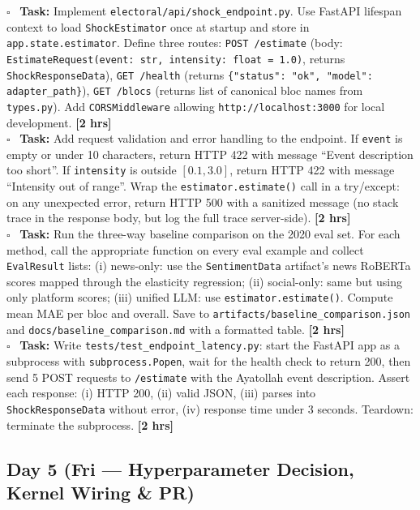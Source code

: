 \documentclass[11pt]{article}
\newcommand{\hrs}[1]{\textbf{[#1 hrs]}}
\newcommand{\dayhead}[2]{%
  \subsection*{Day #1 \normalfont\small\color{codegray}(#2)}}
\newcommand{\task}[2]{%
  \noindent\textbf{Task:} #1 \hfill \hrs{#2}\\}
\newcommand{\done}{\textcolor{sectionblue}{$\square$}\ }
\begin{document}
\begin{taskbox}
\done \task{Implement \texttt{electoral/api/shock\_endpoint.py}. Use FastAPI
  lifespan context to load \texttt{ShockEstimator} once at startup and store
  in \texttt{app.state.estimator}. Define three routes: \texttt{POST /estimate}
  (body: \texttt{EstimateRequest(event: str, intensity: float = 1.0)}, returns
  \texttt{ShockResponseData}), \texttt{GET /health} (returns
  \texttt{\{"status": "ok", "model": adapter\_path\}}), \texttt{GET /blocs}
  (returns list of canonical bloc names from \texttt{types.py}). Add
  \texttt{CORSMiddleware} allowing \texttt{http://localhost:3000} for
  local development.}{2}

\done \task{Add request validation and error handling to the endpoint.
  If \texttt{event} is empty or under 10 characters, return HTTP 422
  with message ``Event description too short''. If \texttt{intensity} is
  outside $[0.1, 3.0]$, return HTTP 422 with message ``Intensity out of
  range''. Wrap the \texttt{estimator.estimate()} call in a try/except:
  on any unexpected error, return HTTP 500 with a sanitized message (no
  stack trace in the response body, but log the full trace server-side).}{2}

\done \task{Run the three-way baseline comparison on the 2020 eval set.
  For each method, call the appropriate function on every eval example
  and collect \texttt{EvalResult} lists: (i) news-only: use the
  \texttt{SentimentData} artifact's news RoBERTa scores mapped through
  the elasticity regression; (ii) social-only: same but using only
  platform scores; (iii) unified LLM: use \texttt{estimator.estimate()}.
  Compute mean MAE per bloc and overall. Save to
  \texttt{artifacts/baseline\_comparison.json} and
  \texttt{docs/baseline\_comparison.md} with a formatted table.}{2}

\done \task{Write \texttt{tests/test\_endpoint\_latency.py}: start the
  FastAPI app as a subprocess with \texttt{subprocess.Popen}, wait for
  the health check to return 200, then send 5 POST requests to
  \texttt{/estimate} with the Ayatollah event description. Assert each
  response: (i) HTTP 200, (ii) valid JSON, (iii) parses into
  \texttt{ShockResponseData} without error, (iv) response time under
  3 seconds. Teardown: terminate the subprocess.}{2}
\end{taskbox}

\dayhead{5}{Fri --- Hyperparameter Decision, Kernel Wiring \& PR}
\end{document}
